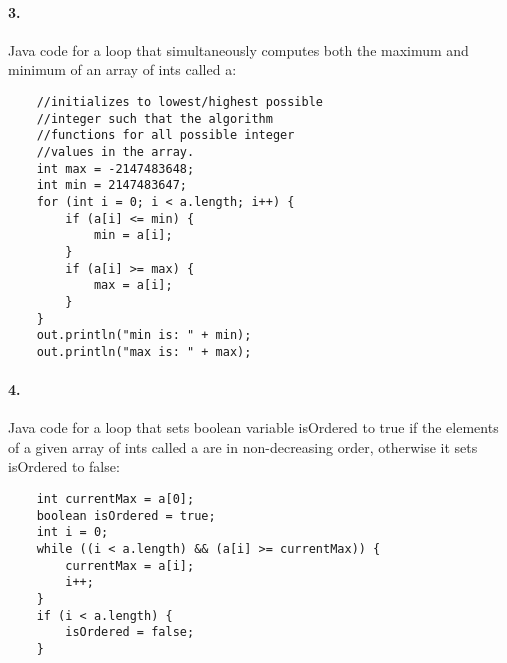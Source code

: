 \documentclass[10pt]{article}
\begin{document}
\paragraph{3. }  Java code for a loop that simultaneously computes both the maximum and minimum of an array of ints called a: 
\begin{lstlisting}
	//initializes to lowest/highest possible 
	//integer such that the algorithm
    //functions for all possible integer 
    //values in the array. 
    int max = -2147483648;
    int min = 2147483647;
    for (int i = 0; i < a.length; i++) {
        if (a[i] <= min) {
            min = a[i];
        }
        if (a[i] >= max) {
            max = a[i];
        }
    }
    out.println("min is: " + min);
    out.println("max is: " + max);
\end{lstlisting}

\paragraph{4. }  Java code for a loop that sets boolean variable isOrdered to true if the elements of a given array of ints called a are in non-decreasing order, otherwise it sets isOrdered to false: 
\begin{lstlisting}
    int currentMax = a[0];
    boolean isOrdered = true;
    int i = 0;
    while ((i < a.length) && (a[i] >= currentMax)) {
        currentMax = a[i];
        i++;
    }
    if (i < a.length) {
        isOrdered = false;
    }
\end{lstlisting}
\end{document}
